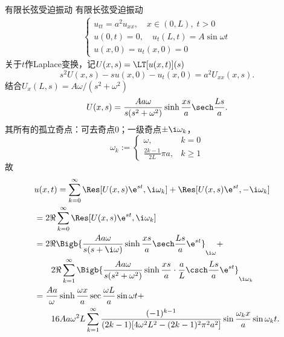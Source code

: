 \begin{example}{有限长弦受迫振动}{}
	有限长弦受迫振动
	\begin{align*}
		\begin{cases}
			u_{tt}=a^2u_{xx},\quad x\in(0,L),\;t>0\\
			u(0,t)=0,\quad u_t(L,t)=A\sin\omega t\\
			u(x,0)=u_t(x,0)=0
		\end{cases}
	\end{align*}
	关于$t$作Laplace变换，记$U(x,s)=\LT[u(x,t)](s)$
	\[
		s^2U(x,s)-s u(x,0)-u_t(x,0)=a^2U_{xx}(x,s).
	\]
	结合$U_x(L,s)=A\omega/(s^2+\omega^2)$
	\[
		U(x,s)=\frac{Aa\omega}{s(s^2+\omega^2)}\sinh\frac{xs}a\sech\frac{Ls}a.
	\]
	其所有的孤立奇点：可去奇点0；一级奇点$\pm\i\omega_k$，
	\[
		\omega_k:=
		\begin{cases}
			\omega,&k=0\\
			\frac{2k-1}{2L}\pi a,&k\geqslant 1
		\end{cases}
	\]
	故
	\begin{align*}
		&u(x,t)=\sum_{k=0}^\infty\Res[U(x,s)\e^{st},\i\omega_k]+\Res[U(x,s)\e^{st},-\i\omega_k]\\
		&=2\Re\sum_{k=0}^\infty\Res[U(x,s)\e^{st},\i\omega_k]\\
		&=2\Re\Bigb{\frac{Aa\omega}{s(s+\i\omega)}\sinh\frac{xs}a\sech\frac{Ls}a\e^{st}}_{\i\omega}+\\
		&\qquad 2\Re\sum_{k=1}^\infty\Bigb{\frac{Aa\omega}{s(s^2+\omega^2)}\sinh\frac{xs}a\cdot\frac aL\csch\frac{Ls}a\e^{st}}_{\i\omega_k}\\
		&=\frac{Aa}\omega\sinh\frac{\omega x}a\sec\frac{\omega L}a\sin\omega t+\\
		&\qquad 16Aa\omega^2L\sum_{k=1}^\infty\frac{(-1)^{k-1}}{(2k-1)[4\omega^2L^2-(2k-1)^2\pi^2a^2]}\sin\frac{\omega_kx}a\sin\omega_kt.
	\end{align*}
\end{example}

